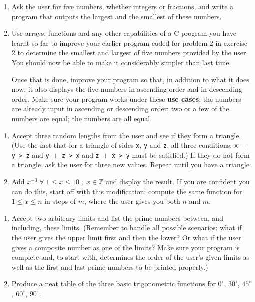 \documentclass{article}
\begin{document}
\begin{enumerate}
\item Ask the user for five numbers, whether integers or fractions, and write a program that outputs the largest and the smallest of these numbers.
\item Use arrays, functions and any other capabilities of a C program you have learnt so far to improve your earlier program coded for problem 2 in exercise 2 to determine the smallest and largest of five numbers provided by the user. You should now be able to make it considerably simpler than last time.

Once that is done, improve your program so that, in addition to what it does now, it also displays the five numbers in ascending order and in descending order. Make sure your program works under these \textbf{use cases}: the numbers are already input in ascending or descending order; two or a few of the numbers are equal; the numbers are all equal.
\end{enumerate}
\vspace{5ex}


\begin{enumerate}
\item Accept three random lengths from the user and see if they form a triangle. (Use the fact that for a triangle of sides \verb+x+, \verb+y+ and \verb+z+, all three conditions, \verb+x ++\verb+ y > z+ and \verb+y ++\verb+ z > x+ and \verb+z ++\verb+ x > y+ must be satisfied.) If they do not form a triangle, ask the user for three new values. Repeat until you have a triangle.
\item Add $x^{-3} \; \forall \; 1 \leq x \leq 10 \; ; \; x \in \mathbb{Z}$ and display the result. If you are confident you can do this, start off with this modification: compute the same function for $1 \leq x \leq n$ in steps of $m$, where the user gives you both $n$ and $m$.
\end{enumerate}
\vspace{5ex}


\begin{enumerate}
\item Accept two arbitrary limits and list the prime numbers between, and including, these limits. (Remember to handle all possible scenarios: what if the user gives the upper limit first and then the lower? Or what if the user gives a composite number as one of the limits? Make sure your program is complete and, to start with, determines the order of the user's given limits as well as the first and last prime numbers to be printed properly.)
\item Produce a neat table of the three basic trigonometric functions for $0^\circ$, $30^\circ$, $45^\circ$, $60^\circ$, $90^\circ$.
\end{enumerate}
\vspace{5ex}
\end{document}
